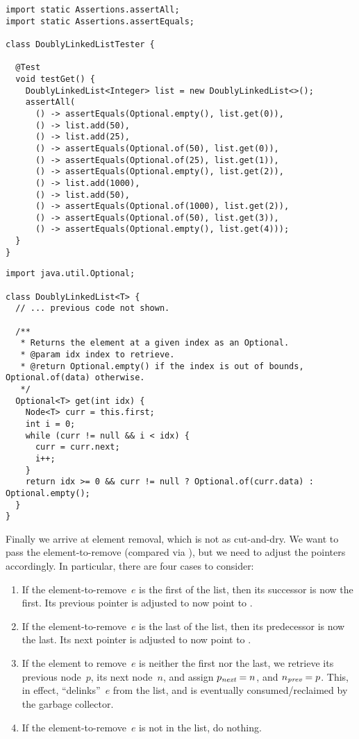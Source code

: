 \begin{lstlisting}[language=MyJava]
import static Assertions.assertAll;
import static Assertions.assertEquals;

class DoublyLinkedListTester {

  @Test
  void testGet() {
    DoublyLinkedList<Integer> list = new DoublyLinkedList<>();
    assertAll(
      () -> assertEquals(Optional.empty(), list.get(0)),
      () -> list.add(50),
      () -> list.add(25),
      () -> assertEquals(Optional.of(50), list.get(0)),
      () -> assertEquals(Optional.of(25), list.get(1)),
      () -> assertEquals(Optional.empty(), list.get(2)),
      () -> list.add(1000),
      () -> list.add(50),
      () -> assertEquals(Optional.of(1000), list.get(2)),
      () -> assertEquals(Optional.of(50), list.get(3)),
      () -> assertEquals(Optional.empty(), list.get(4)));
  }
}
\end{lstlisting}

\begin{lstlisting}[language=MyJava]
import java.util.Optional;

class DoublyLinkedList<T> {
  // ... previous code not shown.

  /**
   * Returns the element at a given index as an Optional.
   * @param idx index to retrieve.
   * @return Optional.empty() if the index is out of bounds, Optional.of(data) otherwise.
   */
  Optional<T> get(int idx) {
    Node<T> curr = this.first;
    int i = 0;
    while (curr != null && i < idx) {
      curr = curr.next;
      i++;
    }
    return idx >= 0 && curr != null ? Optional.of(curr.data) : Optional.empty();
  }
}
\end{lstlisting}

Finally we arrive at element removal, which is not as cut-and-dry. We want to pass the element-to-remove (compared via ), but we need to adjust the pointers accordingly. In particular, there are four cases to consider:

\begin{enumerate}[label=(\alph*)]
  \item If the element-to-remove~$e$ is the first of the list, then its successor is now the first. Its previous pointer is adjusted to now point to .
  \item If the element-to-remove~$e$ is the last of the list, then its predecessor is now the last. Its next pointer is adjusted to now point to .
  \item If the element to remove~$e$ is neither the first nor the last, we retrieve its previous node~$p$, its next node~$n$, and assign $p_\emph{next} = n$, and $n_\emph{prev} = p$. This, in effect, ``delinks''~$e$ from the list, and is eventually consumed/reclaimed by the garbage collector.
  \item If the element-to-remove~$e$ is not in the list, do nothing.
\end{enumerate}

